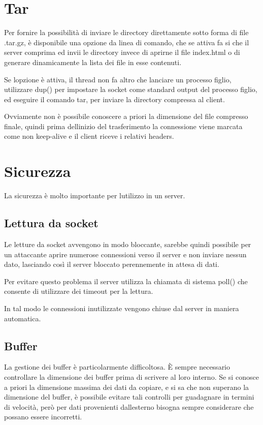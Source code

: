 \documentclass[a4paper,11pt]{article}
\begin{document}
\bigskip

\section{Tar}
{\sffamily
Per fornire la possibilit\`a di inviare le directory direttamente sotto
forma di file .tar.gz, \`e disponibile una opzione da linea di comando,
che se attiva fa si che il server comprima ed invii le directory invece
di aprirne il file index.html o di generare dinamicamente la lista dei
file in esse contenuti.}

{\sffamily
Se l{\textquotesingle}opzione \`e attiva, il thread non fa altro che
lanciare un processo figlio, utilizzare dup() per impostare la socket
come standard output del processo figlio, ed eseguire il comando tar,
per inviare la directory compressa al client.}

{\sffamily
Ovviamente non \`e possibile conoscere a priori la dimensione del file
compresso finale, quindi prima dell{\textquotesingle}inizio del
trasferimento la connessione viene marcata come non keep-alive e il
client riceve i relativi headers.}


\bigskip

\section{Sicurezza}
{\sffamily
La sicurezza \`e molto importante per l{\textquotesingle}utilizzo in un
server.}

\subsection[Lettura da socket]{Lettura da socket}
{\sffamily
Le letture da socket avvengono in modo bloccante, sarebbe quindi
possibile per un attaccante aprire numerose connessioni verso il server
e non inviare nessun dato, lasciando cos\`i il server bloccato
perennemente in attesa di dati.}

{\sffamily
Per evitare questo problema il server utilizza la chiamata di sistema
poll() che consente di utilizzare dei timeout per la lettura.}

{\sffamily
In tal modo le connessioni inutilizzate vengono chiuse dal server in
maniera automatica.}

\subsection{Buffer}
{\sffamily
La gestione dei buffer \`e particolarmente difficoltosa. \`E sempre
necessario controllare la dimensione dei buffer prima di scrivere al
loro interno. Se si conosce a priori la dimensione massima dei dati da
copiare, e si sa che non superano la dimensione del buffer, \`e
possibile evitare tali controlli per guadagnare in termini di
velocit\`a, per\`o per dati provenienti dall{\textquotesingle}esterno
bisogna sempre considerare che possano essere incorretti.}
\end{document}
